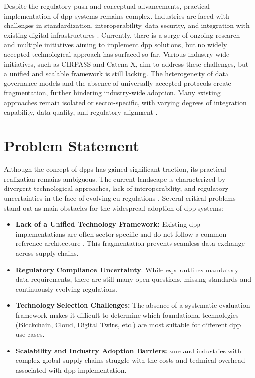 Despite the regulatory push and conceptual advancements, practical implementation of \ac{dpp} systems remains complex. Industries are faced with challenges in standardization, interoperability, data security, and integration with existing digital infrastructures \autocite{Ducuing.2023}. Currently, there is a surge of ongoing research and multiple initiatives aiming to implement \ac{dpp} solutions, but no widely accepted technological approach has surfaced so far. Various industry-wide initiatives, such as CIRPASS and Catena-X, aim to address these challenges, but a unified and scalable framework is still lacking. The heterogeneity of data governance models and the absence of universally accepted protocols create fragmentation, further hindering industry-wide adoption. Many existing approaches remain isolated or sector-specific, with varying degrees of integration capability, data quality, and regulatory alignment \autocite{Jansen.2023,Jousse.2024}.


\section{Problem Statement}
\label{sec:problem_statement}

Although the concept of \acrlong{dpp}s has gained significant traction, its practical realization remains ambiguous. The current landscape is characterized by divergent technological approaches, lack of interoperability, and regulatory uncertainties in the face of evolving \ac{eu} regulations \autocite{Adisorn.2021}. Several critical problems stand out as main obstacles for the widespread adoption of \ac{dpp} systems:

\begin{itemize}
    \item \textbf{Lack of a Unified Technology Framework:} Existing \ac{dpp} implementations are often sector-specific and do not follow a common reference architecture \autocite{Jansen.2023}. This fragmentation prevents seamless data exchange across supply chains.
    \item \textbf{Regulatory Compliance Uncertainty:} While \ac{espr} outlines mandatory data requirements, there are still many open questions, missing standards and continuously evolving regulations. \autocite{Garcia.2024}
    \item \textbf{Technology Selection Challenges:} The absence of a systematic evaluation framework makes it difficult to determine which foundational technologies (Blockchain, Cloud, Digital Twins, etc.) are most suitable for different \ac{dpp} use cases. \autocite{Nowacki.2023}
    \item \textbf{Scalability and Industry Adoption Barriers:} \ac{sme} and industries with complex global supply chains struggle with the costs and technical overhead associated with \ac{dpp} implementation. \autocite{Psarommatis.2024}
\end{itemize}

